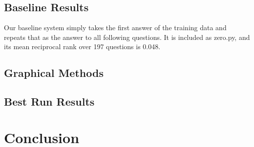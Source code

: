\documentclass{article}
\begin{document}
\subsection{Baseline Results}
Our baseline system simply takes the first answer of the training data and repeats
that as the answer to all following questions. It is included as zero.py, and its
mean reciprocal rank over 197 questions is 0.048.

\subsection{Graphical Methods}

\subsection{Best Run Results}

\section{Conclusion}
\end{document}
